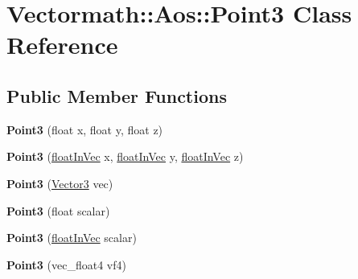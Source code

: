 \hypertarget{classVectormath_1_1Aos_1_1Point3}{\section{Vectormath\-:\-:Aos\-:\-:Point3 Class Reference}
\label{classVectormath_1_1Aos_1_1Point3}
}
\subsection*{Public Member Functions}
\begin{DoxyCompactItemize}
\item 
\hypertarget{classVectormath_1_1Aos_1_1Point3_afefef06db5576da6ba658e4a5d3447b4}{{\bfseries Point3} (float x, float y, float z)}\label{classVectormath_1_1Aos_1_1Point3_afefef06db5576da6ba658e4a5d3447b4}

\item 
\hypertarget{classVectormath_1_1Aos_1_1Point3_af353dd389e12cd4510d06b62689431c4}{{\bfseries Point3} (\hyperlink{classVectormath_1_1floatInVec}{float\-In\-Vec} x, \hyperlink{classVectormath_1_1floatInVec}{float\-In\-Vec} y, \hyperlink{classVectormath_1_1floatInVec}{float\-In\-Vec} z)}\label{classVectormath_1_1Aos_1_1Point3_af353dd389e12cd4510d06b62689431c4}

\item 
\hypertarget{classVectormath_1_1Aos_1_1Point3_a89ff2e36b3e1768a9c2ea50fbe72786f}{{\bfseries Point3} (\hyperlink{classVectormath_1_1Aos_1_1Vector3}{Vector3} vec)}\label{classVectormath_1_1Aos_1_1Point3_a89ff2e36b3e1768a9c2ea50fbe72786f}

\item 
\hypertarget{classVectormath_1_1Aos_1_1Point3_ad462a241848fca89c3954860302a7167}{{\bfseries Point3} (float scalar)}\label{classVectormath_1_1Aos_1_1Point3_ad462a241848fca89c3954860302a7167}

\item 
\hypertarget{classVectormath_1_1Aos_1_1Point3_a92d23f9ab46d8741d4420ba6a4a4c05f}{{\bfseries Point3} (\hyperlink{classVectormath_1_1floatInVec}{float\-In\-Vec} scalar)}\label{classVectormath_1_1Aos_1_1Point3_a92d23f9ab46d8741d4420ba6a4a4c05f}

\item 
\hypertarget{classVectormath_1_1Aos_1_1Point3_afa6a16552c58506d969521a32a16d46b}{{\bfseries Point3} (vec\-\_\-float4 vf4)}\label{classVectormath_1_1Aos_1_1Point3_afa6a16552c58506d969521a32a16d46b}


\end{DoxyCompactItemize}

